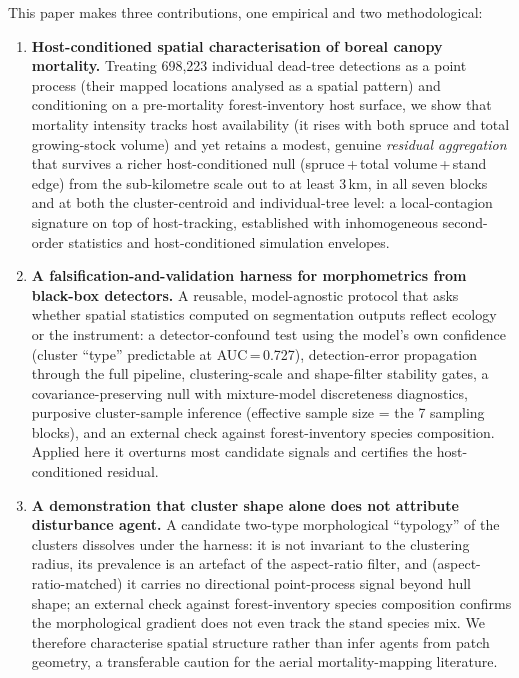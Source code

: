 \documentclass[twocolumn]{article}
\begin{document}
This paper makes three contributions, one empirical and two methodological:
\begin{enumerate}
  \item \textbf{Host-conditioned spatial characterisation of boreal canopy mortality.}
        Treating 698,223 individual dead-tree detections as a point process (their mapped locations
        analysed as a spatial pattern) and conditioning on a pre-mortality forest-inventory host surface, we show that mortality intensity tracks host
        availability (it rises with both spruce and total growing-stock volume) and yet retains a
        modest, genuine \emph{residual aggregation} that survives a richer host-conditioned null
        (spruce\,+\,total volume\,+\,stand edge) from the sub-kilometre scale out to at least 3\,km,
        in all seven blocks and at both the cluster-centroid and individual-tree level: a
        local-contagion signature on top of host-tracking, established with inhomogeneous
        second-order statistics and host-conditioned simulation envelopes.
  \item \textbf{A falsification-and-validation harness for morphometrics from black-box detectors.}
        A reusable, model-agnostic protocol that asks whether spatial statistics computed on
        segmentation outputs reflect ecology or the instrument: a detector-confound test using the
        model's own confidence (cluster ``type'' predictable at AUC\,=\,0.727), detection-error
        propagation through the full pipeline, clustering-scale and shape-filter stability gates, a
        covariance-preserving null with mixture-model discreteness diagnostics, purposive
        cluster-sample inference (effective sample size = the 7 sampling blocks), and an external
        check against forest-inventory species composition. Applied here it
        overturns most candidate signals and certifies the host-conditioned residual.
  \item \textbf{A demonstration that cluster shape alone does not attribute disturbance agent.}
        A candidate two-type morphological ``typology'' of the clusters dissolves under the harness:
        it is not invariant to the clustering radius, its prevalence is an artefact of the
        aspect-ratio filter, and (aspect-ratio-matched) it carries no directional point-process
        signal beyond hull shape; an external check against forest-inventory species composition
        confirms the morphological gradient does not even track the stand species mix. We therefore
        characterise spatial structure rather than infer
        agents from patch geometry, a transferable caution for the aerial mortality-mapping
        literature.
\end{enumerate}
\end{document}

